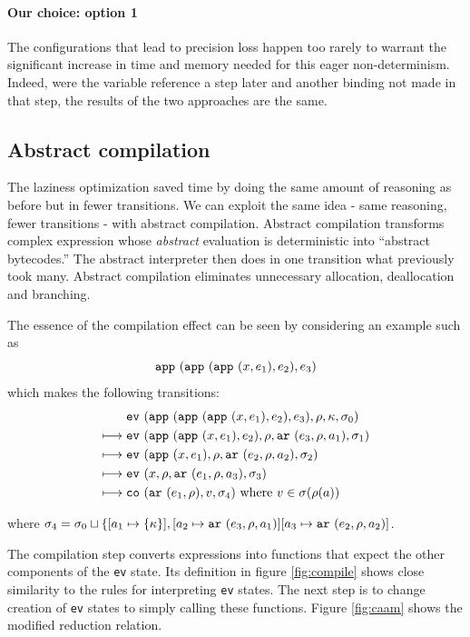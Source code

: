 \documentclass[preprint,onecolumn,9pt]{sigplanconf} %
\begin{document}
\paragraph{Our choice: option 1}
The configurations that lead to precision loss happen too rarely to
warrant the significant increase in time and memory needed for this
eager non-determinism. Indeed, were the variable reference a step
later and another binding not made in that step, the results of the
two approaches are the same.


\subsection{Abstract compilation}

The laziness optimization saved time by doing the same amount of reasoning as before but in fewer transitions. We can exploit the same idea - same reasoning, fewer transitions - with abstract compilation. Abstract compilation transforms complex expression whose \emph{abstract} evaluation is deterministic into ``abstract bytecodes.''  The abstract interpreter then does in one transition what previously took many. Abstract compilation eliminates unnecessary allocation, deallocation and branching.

The essence of the compilation effect can be seen by considering an
example such as
\[
{\tt app{\ }}({{\tt app{\ }}({{\tt app{\ }}({x,e_1}),e_2}),e_3})
\]
which makes the following transitions:
\begin{align}
& \ev{\sapp{\sapp{\sapp\mvar{\mexp_1}}{\mexp_2}}{\mexp_3},\menv,\mkont,\msto_0}\\
\machstep\; &
\ev{\sapp{\sapp\mvar{\mexp_1}}{\mexp_2},\menv,\kar{\mexp_3,\menv,\maddr_1},\msto_1}
\\
\machstep\; &
\ev{\sapp\mvar{\mexp_1},\menv,\kar{\mexp_2,\menv,\maddr_2},\msto_2}
\\
\machstep\; &
\ev{\mvar, \menv,\kar{\mexp_1,\menv,\maddr_3},\msto_3} %
\\
\machstep\; &
\co{\kar{\mexp_1,\menv},\mval,\msto_4} %
\mbox{ where } \mval \in \msto(\menv(\maddr))
\end{align}

where $\sigma_4 = \sigma_0 \sqcup \{ [a_1 \mapsto \{ \kappa \}],
[a_2 \mapsto {\tt ar{\ }}({e_3,\rho,a_1})]
[a_3 \mapsto {\tt ar{\ }}({e_2,\rho,a_2})]$.

The compilation step converts expressions into functions that expect
the other components of the {\tt ev} state. Its definition in figure
\ref{fig:compile} shows close similarity to the rules for interpreting
    {\tt ev} states. The next step is to change creation of {\tt ev}
    states to simply calling these functions. Figure \ref{fig:caam}
    shows the modified reduction relation.
\end{document}
